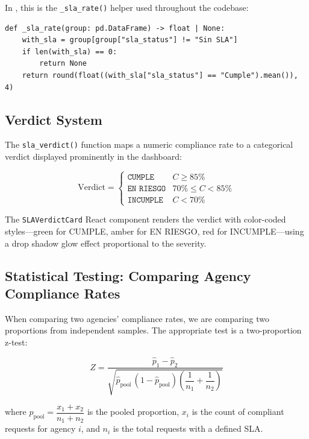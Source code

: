 In , this is the \texttt{\_sla\_rate()} helper used throughout the codebase:

\begin{lstlisting}[style=python, caption={\texttt{\_sla\_rate()} in \texttt{ops\_engine.py}}, label=lst:sla-rate]
def _sla_rate(group: pd.DataFrame) -> float | None:
    with_sla = group[group["sla_status"] != "Sin SLA"]
    if len(with_sla) == 0:
        return None
    return round(float((with_sla["sla_status"] == "Cumple").mean()), 4)
\end{lstlisting}

\subsection{Verdict System}

The \texttt{sla\_verdict()} function maps a numeric compliance rate to a categorical verdict displayed prominently in the dashboard:

\begin{equation}
\text{Verdict} =
\begin{cases}
\texttt{CUMPLE} & C \geq 85\% \\
\texttt{EN RIESGO} & 70\% \leq C < 85\% \\
\texttt{INCUMPLE} & C < 70\%
\end{cases}
\label{eq:sla-verdict}
\end{equation}

The \texttt{SLAVerdictCard} React component renders the verdict with color-coded styles---green for CUMPLE, amber for EN RIESGO, red for INCUMPLE---using a drop shadow glow effect proportional to the severity.

\subsection{Statistical Testing: Comparing Agency Compliance Rates}

When comparing two agencies' compliance rates, we are comparing two proportions from independent samples. The appropriate test is a two-proportion z-test:

\begin{equation}
Z = \frac{\hat{p}_1 - \hat{p}_2}{\sqrt{\hat{p}_{\text{pool}}\,(1-\hat{p}_{\text{pool}})\left(\dfrac{1}{n_1} + \dfrac{1}{n_2}\right)}}
\label{eq:z-test-proportions}
\end{equation}

where $\hat{p}_{\text{pool}} = \dfrac{x_1 + x_2}{n_1 + n_2}$ is the pooled proportion, $x_i$ is the count of compliant requests for agency $i$, and $n_i$ is the total requests with a defined SLA.

